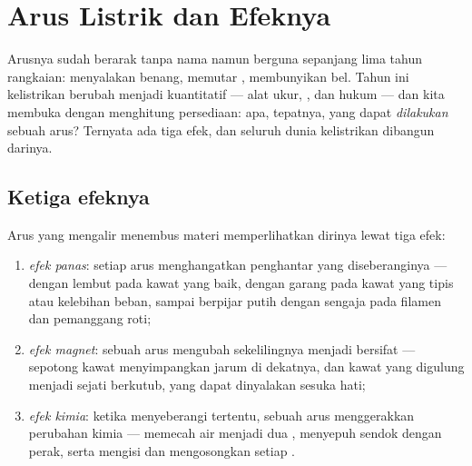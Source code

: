 \chapter{Arus Listrik dan Efeknya}\label{ch:g8:electric-current-effects}

Arusnya sudah berarak tanpa nama namun berguna sepanjang lima tahun
rangkaian: menyalakan benang, memutar , membunyikan bel. Tahun
ini kelistrikan berubah menjadi kuantitatif --- alat ukur, , dan
hukum --- dan kita membuka dengan menghitung persediaan: apa,
tepatnya, yang dapat \emph{dilakukan} sebuah arus? Ternyata ada tiga
efek, dan seluruh dunia kelistrikan dibangun darinya.

\section{Ketiga efeknya}

\begin{proposition}\label{prop:g8:electric-current-effects:three}
Arus yang mengalir menembus materi memperlihatkan dirinya lewat tiga
efek:
\begin{enumerate}
  \item \emph{efek panas}: setiap arus
        menghangatkan penghantar yang diseberanginya --- dengan lembut
        pada kawat yang baik, dengan garang pada kawat yang tipis atau
        kelebihan beban, sampai berpijar putih dengan sengaja pada
        filamen dan pemanggang roti;
  \item \emph{efek magnet}: sebuah arus mengubah
        sekelilingnya menjadi bersifat  --- sepotong kawat
        menyimpangkan jarum  di dekatnya, dan kawat yang
        digulung menjadi  sejati berkutub, yang dapat
        dinyalakan sesuka hati;
  \item \emph{efek kimia}: ketika menyeberangi
         tertentu, sebuah arus menggerakkan perubahan kimia
        --- memecah air menjadi dua , menyepuh sendok dengan
        perak, serta mengisi dan mengosongkan setiap .
\end{enumerate}
\end{proposition}

